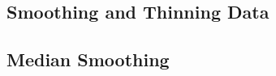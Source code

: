 \begin{refsection}[sorting=nyt]

    \section*{Smoothing and Thinning Data}

    \subsection*{Median Smoothing}


\end{refsection}
